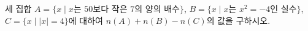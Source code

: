 세 집합 $A=\{x \mid x$는 $50$보다 작은 $7$의 양의 배수$\}$, $B=\{x \mid x$는 $x^2=-4$인 실수$\}$, $C=\{x \mid |x|=4\}$에 대하여 $n(A)+n(B)-n(C)$의 값을 구하시오.
